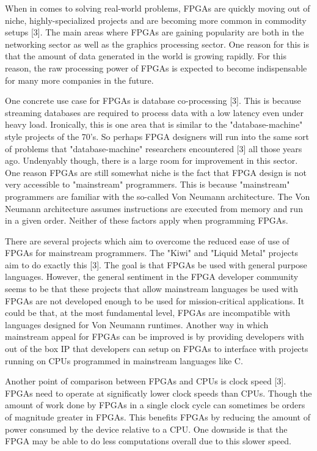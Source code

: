 \documentclass{article}
\begin{document}
    When in comes to solving real-world problems, FPGAs are quickly moving out of niche,
    highly-specialized projects and are becoming more common in commodity setups [3].
    The main areas where FPGAs are gaining popularity are both in the networking sector
    as well as the graphics processing sector. One reason for this is that the amount
    of data generated in the world is growing rapidly. For this reason, the raw processing
    power of FPGAs is expected to become indispensable for many more companies in the future.

    One concrete use case for FPGAs is database co-processing [3]. This is because
    streaming databases are required to process data with a low latency even under heavy
    load. Ironically, this is one area that is similar to the "database-machine" style
    projects of the 70's. So perhaps FPGA designers will run into the same sort of
    problems that "database-machine" researchers encountered [3] all those years ago.
    Undenyably though, there is a large room for improvement in this sector.
    One reason FPGAs are still somewhat niche is the fact that FPGA design is not
    very accessible to "mainstream" programmers. This is because "mainstream" programmers
    are familiar with the so-called Von Neumann architecture. The Von Neumann architecture
    assumes instructions are executed from memory and run in a given order. Neither of these
    factors apply when programming FPGAs.

    There are several projects which aim to overcome the reduced ease of use of FPGAs
    for mainstream programmers. The "Kiwi" and "Liquid Metal" projects aim to do exactly
    this [3]. The goal is that FPGAs be used with general purpose languages.
    However, the general sentiment in the FPGA developer community seems to be that these
    projects that allow mainstream languages be used with FPGAs are not developed
    enough to be used for mission-critical applications.
    It could be that, at the most fundamental level, FPGAs are incompatible with languages
    designed for Von Neumann runtimes.
    Another way in which mainstream appeal for FPGAs can be improved is by
    providing developers with out of the box IP that developers can setup on FPGAs to interface
    with projects running on CPUs programmed in mainstream languages like C.

    Another point of comparison between FPGAs and CPUs is clock speed [3]. FPGAs need to operate
    at significatly lower clock speeds than CPUs. Though the amount of work done by FPGAs
    in a single clock cycle can sometimes be orders of magnitude greater in FPGAs. This benefits
    FPGAs by reducing the amount of power consumed by the device relative to a CPU. One downside
    is that the FPGA may be able to do less computations overall due to this slower speed.
\end{document}

